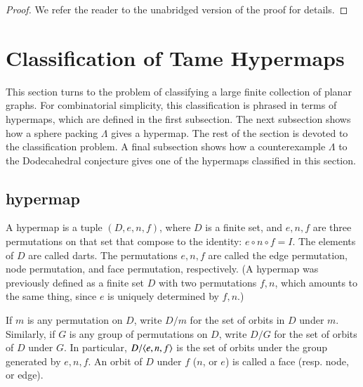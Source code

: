 \begin{proof}



We refer the reader to the unabridged version of the proof for details.
\end{proof}



\section{Classification of Tame Hypermaps}

This section turns to the problem of classifying a large finite collection
of planar graphs. For combinatorial simplicity, this classification is phrased
in terms of hypermaps, which are defined in the first subsection.
The next subsection shows how a sphere packing $\Lambda$ gives a hypermap.
The rest of the section is devoted to the classification problem.
A final subsection shows how a counterexample $\Lambda$ to the Dodecahedral
conjecture gives one of the hypermaps classified in this section.

\subsection{hypermap}

A hypermap is a tuple $(D,e,n,f)$, where $D$ is a finite
set, and $e,n,f$ are three permutations on that set that
compose to the identity:
$e\circ n\circ f = I$.  The elements of $D$ are called darts.
The permutations $e,n,f$ are called the edge permutation,
node permutation, and face permutation, respectively.
(A hypermap was previously defined as a finite set $D$ with
two permutations $f,n$, which amounts to the same thing,
since $e$ is uniquely determined by $f,n$.)

If $m$ is any permutation on $D$, write $D/m$ for the
set of orbits in $D$ under $m$.  Similarly, if $G$ is any
group of permutations on $D$, write $D/G$ for the set
of orbits of $D$ under $G$.  In particular, $D/\langle e,n,f\rangle$
is the set of orbits under the group generated by $e,n,f$.
An orbit of $D$ under $f$ ($n$, or $e$) is called a face (resp.
node, or edge).

